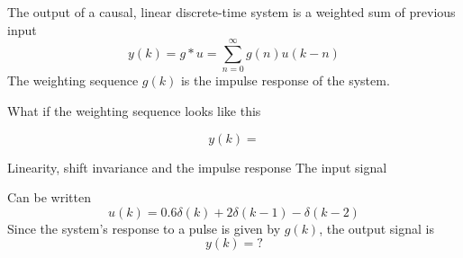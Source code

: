 \documentclass[presentation,aspectratio=1610]{beamer}
\begin{document}
\begin{frame}[label={sec:orgc5e7b8c}]{The output of a causal, linear discrete-time system is a weighted sum of previous input}
\[ y(k) = g \ast u = \sum_{n=0}^\infty g(n) u(k-n) \]
The \alert{weighting sequence} \(g(k)\) is the \alert{impulse response} of the system.

What if the weighting sequence looks like this

\begin{center}
\end{center}

\[y(k) = \]
\end{frame}

\begin{frame}[label={sec:orge36b485}]{Linearity, shift invariance and the impulse response}
The input signal

\begin{center}
\end{center}

Can be written 
\[u(k) = 0.6\delta(k) + 2\delta(k-1) - \delta(k-2) \]
Since the system's response to a pulse is given by \(g(k)\), the output signal is
\[ y(k) = ?\]
\end{frame}
\end{document}

